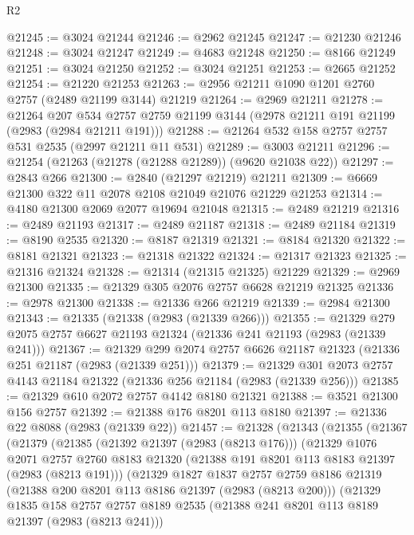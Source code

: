 \begin{lexlean}{R2}
\begin{coremodule}
@21245 := @3024 @21244
@21246 := @2962 @21245
@21247 := @21230 @21246
@21248 := @3024 @21247
@21249 := @4683 @21248
@21250 := @8166 @21249
@21251 := @3024 @21250
@21252 := @3024 @21251
@21253 := @2665 @21252
@21254 := @21220 @21253
@21263 := @2956 @21211 @1090 @1201 @2760 @2757 (@2489 @21199 @3144) @21219
@21264 := @2969 @21211
@21278 := @21264
    @207
    @534
    @2757
    @2759
    @21199
    @3144
    (@2978 @21211 @191 @21199 (@2983 (@2984 @21211 @191)))
@21288 := @21264 @532 @158 @2757 @2757 @531 @2535 (@2997 @21211 @11 @531)
@21289 := @3003 @21211
@21296 := @21254 (@21263 (@21278 (@21288 @21289)) (@9620 @21038 @22))
@21297 := @2843 @266
@21300 := @2840 (@21297 @21219) @21211
@21309 := @6669 @21300 @322 @11 @2078 @2108 @21049 @21076 @21229 @21253
@21314 := @4180 @21300 @2069 @2077 @19694 @21048
@21315 := @2489 @21219
@21316 := @2489 @21193
@21317 := @2489 @21187
@21318 := @2489 @21184
@21319 := @8190 @2535
@21320 := @8187 @21319
@21321 := @8184 @21320
@21322 := @8181 @21321
@21323 := @21318 @21322
@21324 := @21317 @21323
@21325 := @21316 @21324
@21328 := @21314 (@21315 @21325) @21229
@21329 := @2969 @21300
@21335 := @21329 @305 @2076 @2757 @6628 @21219 @21325
@21336 := @2978 @21300
@21338 := @21336 @266 @21219
@21339 := @2984 @21300
@21343 := @21335 (@21338 (@2983 (@21339 @266)))
@21355 := @21329 @279 @2075 @2757 @6627 @21193 @21324 (@21336 @241 @21193 (@2983 (@21339 @241)))
@21367 := @21329 @299 @2074 @2757 @6626 @21187 @21323 (@21336 @251 @21187 (@2983 (@21339 @251)))
@21379 := @21329 @301 @2073 @2757 @4143 @21184 @21322 (@21336 @256 @21184 (@2983 (@21339 @256)))
@21385 := @21329 @610 @2072 @2757 @4142 @8180 @21321
@21388 := @3521 @21300 @156 @2757
@21392 := @21388 @176 @8201 @113 @8180
@21397 := @21336 @22 @8088 (@2983 (@21339 @22))
@21457 := @21328
    (@21343
      (@21355
        (@21367
          (@21379
            (@21385
              (@21392 @21397 (@2983 (@8213 @176)))
              (@21329
                @1076
                @2071
                @2757
                @2760
                @8183
                @21320
                (@21388 @191 @8201 @113 @8183 @21397 (@2983 (@8213 @191)))
                (@21329
                  @1827
                  @1837
                  @2757
                  @2759
                  @8186
                  @21319
                  (@21388 @200 @8201 @113 @8186 @21397 (@2983 (@8213 @200)))
                  (@21329
                    @1835
                    @158
                    @2757
                    @2757
                    @8189
                    @2535
                    (@21388 @241 @8201 @113 @8189 @21397 (@2983 (@8213 @241)))

\end{coremodule}
\end{lexlean}
